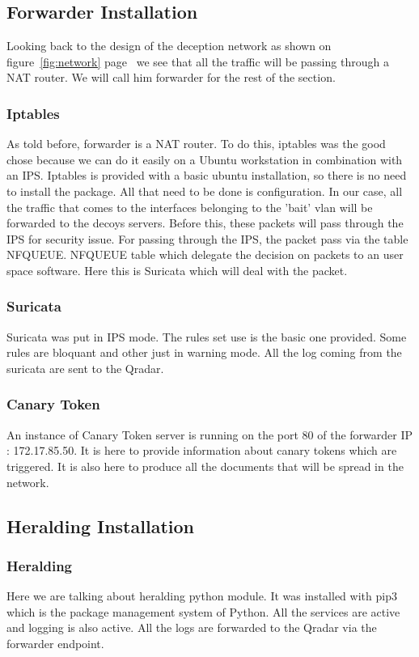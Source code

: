 \documentclass{tnreport}
\begin{document}
\subsection{Forwarder Installation}
Looking back to the design of the deception network as shown on figure~\ref{fig:network} page~\pageref{fig:network} we see that all the traffic will be passing through a NAT router. We will call him forwarder for the rest of the section.
\subsubsection{Iptables}
As told before, forwarder is a NAT router. To do this, iptables was the good chose because we can do it easily on a Ubuntu workstation in combination with an \gls{IPS}. Iptables is provided with a basic ubuntu installation, so there is no need to install the package. \eol All that need to be done is configuration. In our case, all the traffic that comes to the interfaces belonging to the 'bait' vlan will be forwarded to the decoys servers. Before this, these packets will pass through the \gls{IPS} for security issue. For passing through the IPS, the packet pass via the table NFQUEUE. NFQUEUE table which delegate the decision on packets to an user space software. Here this is Suricata which will deal with the packet.

\subsubsection{Suricata}
Suricata was put in IPS mode. The rules set use is the basic one provided. Some rules are bloquant and other just in warning mode. All the log coming from the suricata are sent to the Qradar.

\subsubsection{Canary Token}
An instance of Canary Token server is running on the port 80 of the forwarder IP : 172.17.85.50. It is here to provide information about canary tokens which are triggered. It is also here to produce all the documents that will be spread in the network. 

\subsection{Heralding Installation}

\subsubsection{Heralding}
Here we are talking about heralding python module. It was installed with pip3 which is the package management system of Python. All the services are active and logging is also active. All the logs are forwarded to the Qradar via the forwarder endpoint.
\end{document}
